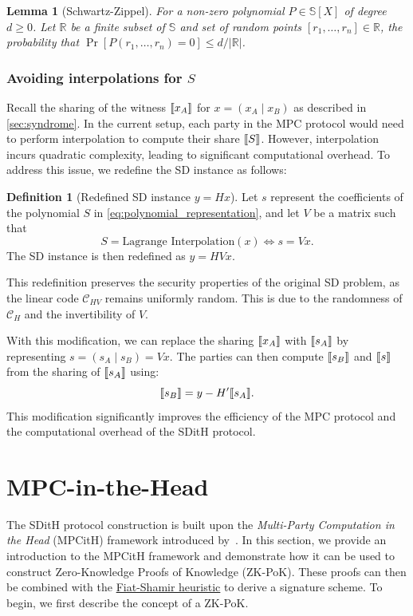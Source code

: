 \documentclass[11pt]{report}
\theoremstyle{definition}
\newtheorem{definition}{Definition}[section]
\theoremstyle{plain}
\newtheorem{lemma}{Lemma}[section]
\begin{document}
\begin{lemma}[Schwartz-Zippel]\label{lem:schwartz}
  For a non-zero polynomial $P \in \mathbb{S}[X]$ of degree $d \geq 0$. Let $\mathbb{R}$ be a finite subset of $\mathbb{S}$ and set of random points $[r_1, \dots, r_n] \in \mathbb{R}$, the probability that $\Pr[P(r_1, \dots, r_n) = 0] \leq d/|\mathbb{R}|$.
\end{lemma}

\subsubsection{Avoiding interpolations for $S$}\label{sec:syndrome-avoid-interpolation}
Recall the sharing of the witness $\llbracket x_A \rrbracket$ for $x = (x_A \mid x_B)$ as described in \autoref{sec:syndrome}. In the current setup, each party in the MPC protocol would need to perform interpolation to compute their share $\llbracket S \rrbracket$. However, interpolation incurs quadratic complexity, leading to significant computational overhead. To address this issue, we redefine the SD instance as follows:

\begin{definition}[Redefined SD instance $y = Hx$]
  Let $s$ represent the coefficients of the polynomial $S$ in \autoref{eq:polynomial_representation}, and let $V$ be a matrix such that \[ S = \text{Lagrange Interpolation}(x) \Leftrightarrow s = Vx. \]
  The SD instance is then redefined as $y = HVx$.
\end{definition}

This redefinition preserves the security properties of the original SD problem, as the linear code $\mathcal{C}_{HV}$ remains uniformly random. This is due to the randomness of $\mathcal{C}_H$ and the invertibility of $V$.

With this modification, we can replace the sharing $\llbracket x_A \rrbracket$ with $\llbracket s_A \rrbracket$ by representing $s = (s_A \mid s_B) = Vx$. The parties can then compute $\llbracket s_B \rrbracket$ and $\llbracket s \rrbracket$ from the sharing of $\llbracket s_A \rrbracket$ using:
\[
  \llbracket s_B \rrbracket = y - H'\llbracket s_A \rrbracket.
\]
This modification significantly improves the efficiency of the MPC protocol and the computational overhead of the SDitH protocol.

\section{MPC-in-the-Head}\label{sec:mpcinth}

The SDitH protocol construction is built upon the \textit{Multi-Party Computation in the Head} (MPCitH) framework introduced by~\cite{ishai2007zero}. In this section, we provide an introduction to the MPCitH framework and demonstrate how it can be used to construct Zero-Knowledge Proofs of Knowledge (ZK-PoK). These proofs can then be combined with the \hyperref[sec:fiatshamir]{Fiat-Shamir heuristic} to derive a signature scheme. To begin, we first describe the concept of a ZK-PoK.
\end{document}
